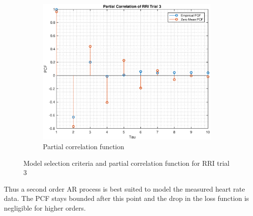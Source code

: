\begin{figure}[h!]
\begin{subfigure}{0.32\textwidth}
\centering
\includegraphics[width = \textwidth]{heart_pcf_t3}
\caption{Partial correlation function}
\label{fig:heart_pcf_t3}
\end{subfigure}
\caption{Model selection criteria and partial correlation function for RRI trial 3}
\label{heart_t3}
\end{figure}

Thus a second order AR process is best suited to model the measured heart rate data. The PCF stays bounded after this point and the drop in the loss function is negligible for higher orders.

%
